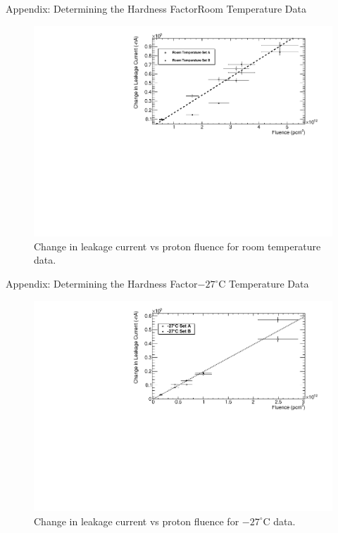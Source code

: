 \documentclass{beamer}
\begin{document}
    \begin{frame}{Appendix: Determining the Hardness Factor}{Room Temperature Data}
        \begin{figure}
            \centering
            \includegraphics[width=0.9\linewidth]{Leakage_Fluence_Combined_Warm_0603.pdf}
            \caption{Change in leakage current vs proton fluence for room temperature data.}
        \end{figure}
    \end{frame}
    
    \begin{frame}{Appendix: Determining the Hardness Factor}{$-27^{\circ}$C Temperature Data}
        \begin{figure}
            \centering
            \includegraphics[width=0.9\linewidth]{Leakage_Fluence_Combined_Cold_0603.pdf}
            \caption{Change in leakage current vs proton fluence for $-27^{\circ}$C data.}
        \end{figure}
    \end{frame}
    
\end{document}
